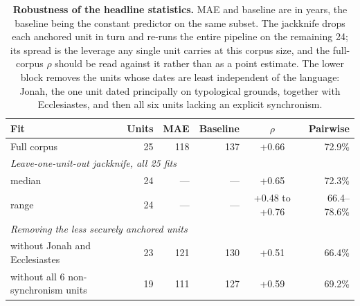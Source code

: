 \begin{table}[!ht]
\centering
\footnotesize
\caption{\textbf{Robustness of the headline statistics.}  MAE and baseline are in years, the baseline being the constant predictor on the same subset.  The jackknife drops each anchored unit in turn and re-runs the entire pipeline on the remaining 24; its spread is the leverage any single unit carries at this corpus size, and the full-corpus $\rho$ should be read against it rather than as a point estimate.  The lower block removes the units whose dates are least independent of the language: Jonah, the one unit dated principally on typological grounds, together with Ecclesiastes, and then all six units lacking an explicit synchronism.}
\label{tab:anchors}
\begin{tabular}{lrrrcr}
\toprule
\textbf{Fit} & \textbf{Units} & \textbf{MAE} & \textbf{Baseline} & \textbf{$\rho$} & \textbf{Pairwise} \\
\midrule
Full corpus & 25 & 118 & 137 & +0.66 & 72.9\% \\
\midrule
\multicolumn{6}{l}{\textit{Leave-one-unit-out jackknife, all 25 fits}} \\
\quad median & 24 & --- & --- & +0.65 & 72.3\% \\
\quad range & 24 & --- & --- & +0.48 to +0.76 & 66.4--78.6\% \\
\midrule
\multicolumn{6}{l}{\textit{Removing the less securely anchored units}} \\
\quad without Jonah and Ecclesiastes & 23 & 121 & 130 & +0.51 & 66.4\% \\
\quad without all 6 non-synchronism units & 19 & 111 & 127 & +0.59 & 69.2\% \\
\bottomrule
\end{tabular}
\end{table}
